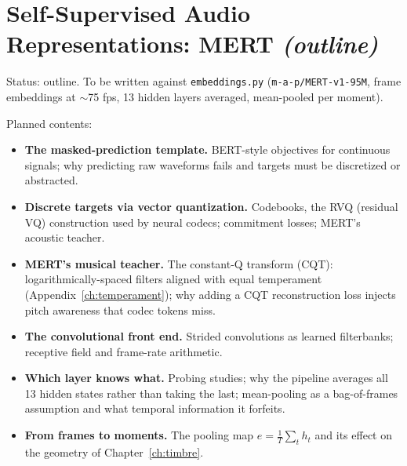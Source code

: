 \chapter{Self-Supervised Audio Representations: MERT \emph{(outline)}}\label{ch:selfsup}

\begin{incode}
Status: outline. To be written against \texttt{embeddings.py}
(\texttt{m-a-p/MERT-v1-95M}, frame embeddings at $\sim$75 fps, 13 hidden
layers averaged, mean-pooled per moment).
\end{incode}

Planned contents:
\begin{itemize}
  \item \textbf{The masked-prediction template.} BERT-style objectives for
  continuous signals; why predicting raw waveforms fails and targets must be
  discretized or abstracted.
  \item \textbf{Discrete targets via vector quantization.} Codebooks,
  the RVQ (residual VQ) construction used by neural codecs; commitment
  losses; MERT's acoustic teacher.
  \item \textbf{MERT's musical teacher.} The constant-Q transform (CQT):
  logarithmically-spaced filters aligned with equal temperament
  (Appendix~\ref{ch:temperament}); why adding a CQT reconstruction loss
  injects pitch awareness that codec tokens miss.
  \item \textbf{The convolutional front end.} Strided convolutions as
  learned filterbanks; receptive field and frame-rate arithmetic.
  \item \textbf{Which layer knows what.} Probing studies; why the pipeline
  averages all 13 hidden states rather than taking the last; mean-pooling as
  a bag-of-frames assumption and what temporal information it forfeits.
  \item \textbf{From frames to moments.} The pooling map
  $e = \frac{1}{T}\sum_t h_t$ and its effect on the geometry of
  Chapter~\ref{ch:timbre}.
\end{itemize}
